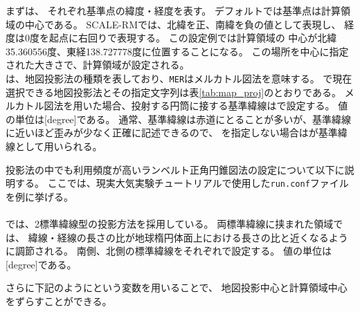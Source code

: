 \noindent
まずは、
それぞれ基準点の緯度・経度を表す。
デフォルトでは基準点は計算領域の中心である。
SCALE-RMでは、北緯を正、南緯を負の値として表現し、
経度は0度を起点に右回りで表現する。
この設定例では計算領域の
中心が北緯35.360556度、東経138.727778度に位置することになる。
この場所を中心に指定された大きさで、計算領域が設定される。\\
は、地図投影法の種類を表しており、\verb|MER|はメルカトル図法を意味する。
\scalerm で現在選択できる地図投影法とその指定文字列は表\ref{tab:map_proj}のとおりである。
メルカトル図法を用いた場合、投射する円筒に接する基準緯線はで設定する。
値の単位は[degree]である。
通常、基準緯線は赤道にとることが多いが、基準緯線に近いほど歪みが少なく正確に記述できるので、
を指定しない場合はが基準緯線として用いられる。

投影法の中でも利用頻度が高いランベルト正角円錐図法の設定について以下に説明する。
ここでは、現実大気実験チュートリアルで使用した\verb|run.conf|ファイルを例に挙げる。\\

{\small {\gt
{}}}\\

\noindent
\scalerm では、2標準緯線型の投影方法を採用している。
両標準緯線に挟まれた領域では、
緯線・経線の長さの比が地球楕円体面上における長さの比と近くなるように調節される。
南側、北側の標準緯線をそれぞれで設定する。
値の単位は[degree]である。

さらに下記のようにという変数を用いることで、
地図投影中心と計算領域中心をずらすことができる。\\~\\

